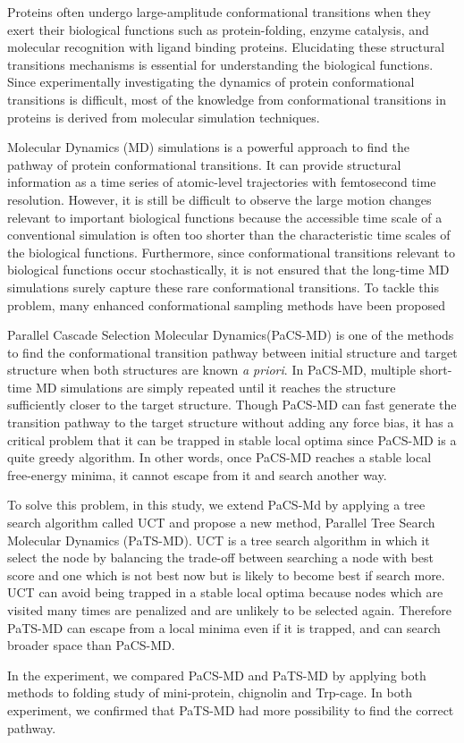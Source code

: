 Proteins often undergo large-amplitude conformational transitions when they exert their biological functions such as protein-folding, enzyme catalysis, and molecular recognition with ligand binding proteins. Elucidating these structural transitions mechanisms is essential for understanding the biological functions. Since experimentally investigating the dynamics of protein conformational transitions is difficult, most of the knowledge from conformational transitions in proteins is derived from molecular simulation techniques.

Molecular Dynamics (MD) simulations is a powerful approach to find the pathway of protein conformational transitions. It can provide structural information as a time series of atomic-level trajectories with femtosecond time resolution. However, it is still be difficult to observe the large motion changes relevant to important biological functions because the accessible time scale of a conventional simulation is often too shorter than the characteristic time scales of the biological functions.
Furthermore, since conformational transitions relevant to biological functions occur stochastically, it is not ensured that the long-time MD simulations surely capture these rare conformational transitions.
To tackle this problem, many enhanced conformational sampling methods have been proposed  

Parallel Cascade Selection Molecular Dynamics(PaCS-MD) \citep{harada2013parallel} is one of the methods to find the conformational transition pathway between initial structure and target structure when both structures are known {\it a priori}. In PaCS-MD, multiple short-time MD simulations are simply repeated until it reaches the structure sufficiently closer to the target structure.
Though PaCS-MD can fast generate the transition pathway to the target structure without adding any force bias, it has a critical problem that it can be trapped in stable local optima since PaCS-MD is a quite greedy algorithm. In other words, once PaCS-MD reaches a stable local free-energy minima, it cannot escape from it and search another way.

To solve this problem, in this study, we extend PaCS-Md by applying a tree search algorithm called UCT \citep{kocsis2006bandit} and propose a new method, Parallel Tree Search Molecular Dynamics (PaTS-MD). UCT is a tree search algorithm in which it select the node by balancing the trade-off between searching a node with best score and one which is not best now but is likely to become best if search more.
UCT can avoid being trapped in a stable local optima because nodes which are visited many times are penalized and are unlikely to be selected again. Therefore PaTS-MD can escape from a local minima even if it is trapped, and  can search broader space than PaCS-MD.

In the experiment, we compared PaCS-MD and PaTS-MD by applying both methods to folding study of mini-protein, chignolin and Trp-cage. In both experiment, we confirmed that PaTS-MD had more possibility to find the correct pathway.